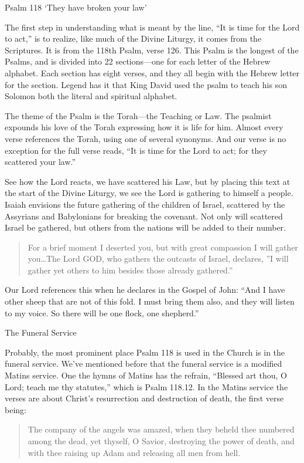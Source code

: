 \documentclass[
]{article}
\newcommand{\RL}[1]{\beginR #1\endR}
\begin{document}
Psalm 118 `They have broken your law'

The first step in understanding what is meant by the line, ``It is time
for the Lord to act,'' is to realize, like much of the Divine Liturgy,
it comes from the Scriptures. It is from the 118th Psalm, verse 126.
This Psalm is the longest of the Psalms, and is divided into 22
sections---one for each letter of the Hebrew alphabet. Each section has
eight verses, and they all begin with the Hebrew letter for the section.
Legend has it that King David used the psalm to teach his son Solomon
both the literal and spiritual alphabet.

The theme of the Psalm is the Torah---the Teaching or Law. The psalmist
expounds his love of the Torah expressing how it is life for him. Almost
every verse references the Torah, using one of several synonyms. And our
verse is no exception for the full verse reads, ``It is time for the
Lord to act; for they scattered your law.''

See how the Lord reacts, we have scattered his Law, but by placing this
text at the start of the Divine Liturgy, we see the Lord is gathering to
himself a people. Isaiah envisions the future gathering of the children
of Israel, scattered by the Assyrians and Babylonians for breaking the
covenant. Not only will scattered Israel be gathered, but others from
the nations will be added to their number.

\begin{quote}
For a brief moment I deserted you, but with great compassion I will
gather you\ldots The Lord GOD, who gathers the outcasts of Israel,
declares, \RL{''}I will gather yet others to him besides those already
gathered.''
\end{quote}

Our Lord references this when he declares in the Gospel of John: ``And I
have other sheep that are not of this fold. I must bring them also, and
they will listen to my voice. So there will be one flock, one
shepherd.''

The Funeral Service

Probably, the most prominent place Psalm 118 is used in the Church is in
the funeral service. We've mentioned before that the funeral service is
a modified Matins service. One the hymns of Matins has the refrain,
``Blessed art thou, O Lord; teach me thy statutes,'' which is Psalm
118.12. In the Matins service the verses are about Christ's resurrection
and destruction of death, the first verse being:

\begin{quote}
The company of the angels was amazed, when they beheld thee numbered
among the dead, yet thyself, O Savior, destroying the power of death,
and with thee raising up Adam and releasing all men from hell.
\end{quote}
\end{document}
